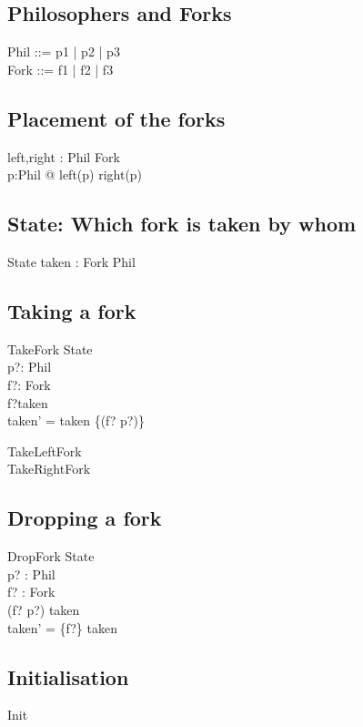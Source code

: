 \documentclass{article}
\begin{document}
\subsection*{Philosophers and Forks}

\begin{zed}
  Phil ::= p1 | p2 | p3\\
  Fork ::= f1 | f2 | f3\\
\end{zed}

\subsection*{Placement of the forks}
\begin{axdef}
  left,right : Phil \bij Fork\\
  \where
  \forall p:Phil @ left(p) \neq right(p)
\end{axdef}

\subsection*{State: Which fork is taken by whom}
\begin{schema}{State}
  taken : Fork \pfun Phil
\end{schema}

\subsection*{Taking a fork}
\begin{schema}{TakeFork}
  \Delta State\\
  p?: Phil\\
  f?: Fork\\
  \where
  f?\notin \dom taken\\
  taken' = taken \oplus \{(f? \mapsto p?)\}\\
\end{schema}

\begin{zed}
  TakeLeftFork \\
  TakeRightFork \\
\end{zed}

\subsection*{Dropping a fork}
\begin{schema}{DropFork}
  \Delta State\\
  p? : Phil\\
  f? : Fork\\
  \where
  (f? \mapsto p?) \in taken\\
  taken' = \{f?\} \ndres taken
\end{schema}

\subsection*{Initialisation}
\begin{zed}
  Init 
\end{zed}
\end{document}
